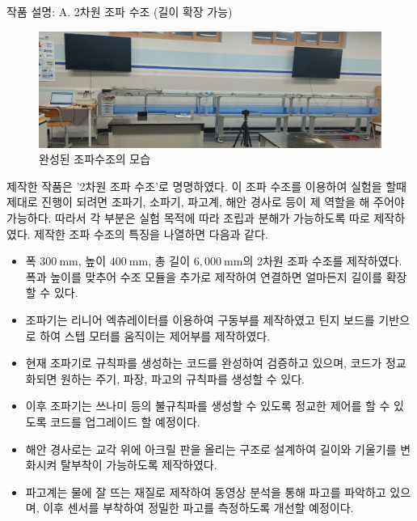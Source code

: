 \documentclass[a0paper,portrait]{baposter}
\begin{document}
\begin{poster}
\begin{posterbox}[name=wtank,span=2,column=1,row=0] {작품 설명: A. 2차원 조파 수조 (길이 확장 가능)}
\begin{figure}[H]
        \includegraphics[width=\textwidth]{images/Experiment_System_Crop}
        \caption{완성된 조파수조의 모습}
        \label{Experimnet_System} 
\end{figure} 
\scriptsize 제작한 작품은 '2차원 조파 수조'로 명명하였다. 이 조파 수조를 이용하여 실험을 할때 제대로 진행이 되려면 조파기, 소파기, 파고계, 해안 경사로 등이 제 역할을 해 주어야 가능하다. 따라서 각 부분은 실험 목적에 따라 조립과 분해가 가능하도록 따로 제작하였다. 제작한 조파 수조의 특징을 나열하면 다음과 같다.
\begin{itemize}
    \item 폭 $300~\mathrm{mm}$, 높이 $400~\mathrm{mm}$, 총 길이 $6,000~\mathrm{mm}$의 2차원 조파 수조를 제작하였다. 폭과 높이를 맞추어 수조 모듈을 추가로 제작하여 연결하면 얼마든지 길이를 확장할 수 있다. 
    \item 조파기는 리니어 엑츄레이터를 이용하여 구동부를 제작하였고 틴지 보드를 기반으로 하여 스텝 모터를 움직이는 제어부를 제작하였다. 
    \item 현재 조파기로 규칙파를 생성하는 코드를 완성하여 검증하고 있으며, 코드가 정교화되면 원하는 주기, 파장, 파고의 규칙파를 생성할 수 있다. 
    \item 이후 조파기는 쓰나미 등의 불규칙파를 생성할 수 있도록 정교한 제어를 할 수 있도록 코드를 업그레이드 할 예정이다. 
    \item 해안 경사로는 교각 위에 아크릴 판을 올리는 구조로 설계하여 길이와 기울기를 변화시켜 탈부착이 가능하도록 제작하였다. 
    \item 파고계는 물에 잘 뜨는 재질로 제작하여 동영상 분석을 통해 파고를 파악하고 있으며, 이후 센서를 부착하여 정밀한 파고를 측정하도록 개선할 예정이다.
\end{itemize}


\end{posterbox}
\end{poster}
\end{document}

